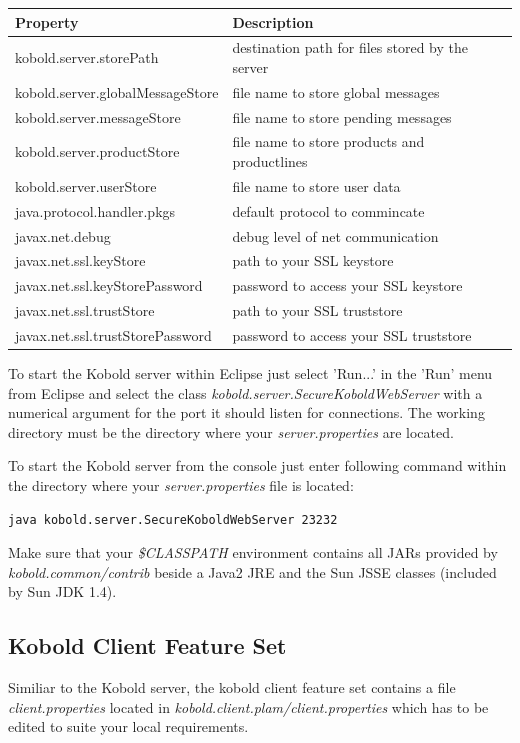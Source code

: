 \begin{tabular}{|l|l|l|}\hline
\textbf{Property} &  \textbf{Description}\\ \hline
kobold.server.storePath  & destination path for files stored by the server \\ \hline
kobold.server.globalMessageStore & file name to store global messages \\
    \hline
kobold.server.messageStore & file name to store pending messages \\
    \hline
kobold.server.productStore & file name to store products and
productlines \\ \hline
kobold.server.userStore & file name to store user data \\ \hline
java.protocol.handler.pkgs & default protocol to commincate \\ \hline
javax.net.debug & debug level of net communication \\ \hline
javax.net.ssl.keyStore & path to your SSL keystore \\ \hline
javax.net.ssl.keyStorePassword & password to access your SSL keystore \\
    \hline
javax.net.ssl.trustStore & path to your SSL truststore \\ \hline
javax.net.ssl.trustStorePassword & password to access your SSL
truststore \\ \hline
\end{tabular}

To start the Kobold server within Eclipse just select 'Run...' in the
'Run' menu from
Eclipse and select the class
{\it kobold.server.SecureKoboldWebServer} with a numerical argument for
the port it should listen for connections. The working directory must be
the directory where your {\it server.properties} are located.

To start the Kobold server from the console just enter following
command within the directory where your {\it server.properties} file is
located:

\begin{verbatim}
java kobold.server.SecureKoboldWebServer 23232
\end{verbatim}

Make sure that your {\it \$CLASSPATH} environment contains all JARs
provided by {\it kobold.common/contrib} beside a Java2 JRE and the Sun
JSSE classes (included by Sun JDK 1.4).

\subsection{Kobold Client Feature Set}
Similiar to the Kobold server, the kobold client feature set contains
a file {\it client.properties} located in {\it
kobold.client.plam/client.properties} which has to be edited to
suite your local requirements.

